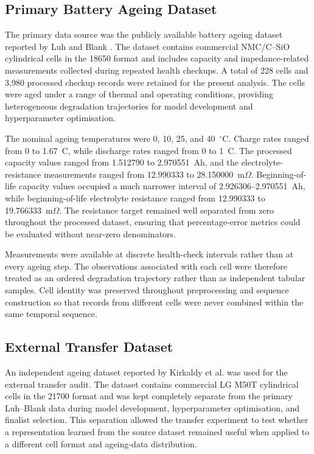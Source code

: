 \documentclass[a4paper,fleqn]{cas-sc}
\begin{document}
\subsection{Primary Battery Ageing Dataset}
\label{sec:primary_dataset}

The primary data source was the publicly available battery ageing dataset reported by Luh and Blank \cite{luh2024dataset}. The dataset contains commercial NMC/C--SiO cylindrical cells in the 18650 format and includes capacity and impedance-related measurements collected during repeated health checkups. A total of 228 cells and 3,980 processed checkup records were retained for the present analysis. The cells were aged under a range of thermal and operating conditions, providing heterogeneous degradation trajectories for model development and hyperparameter optimisation.

The nominal ageing temperatures were 0, 10, 25, and 40~$^{\circ}$C. Charge rates ranged from 0 to 1.67~C, while discharge rates ranged from 0 to 1~C. The processed capacity values ranged from 1.512790 to 2.970551~Ah, and the electrolyte-resistance measurements ranged from 12.990333 to 28.150000~m$\Omega$. Beginning-of-life capacity values occupied a much narrower interval of 2.926306--2.970551~Ah, while beginning-of-life electrolyte resistance ranged from 12.990333 to 19.766333~m$\Omega$. The resistance target remained well separated from zero throughout the processed dataset, ensuring that percentage-error metrics could be evaluated without near-zero denominators.

Measurements were available at discrete health-check intervals rather than at every ageing step. The observations associated with each cell were therefore treated as an ordered degradation trajectory rather than as independent tabular samples. Cell identity was preserved throughout preprocessing and sequence construction so that records from different cells were never combined within the same temporal sequence.




\subsection{External Transfer Dataset}
\label{sec:external_dataset}

An independent ageing dataset reported by Kirkaldy et al. \cite{kirkaldy2024dataset} was used for the external transfer audit. The dataset contains commercial LG M50T cylindrical cells in the 21700 format and was kept completely separate from the primary Luh--Blank data during model development, hyperparameter optimisation, and finalist selection. This separation allowed the transfer experiment to test whether a representation learned from the source dataset remained useful when applied to a different cell format and ageing-data distribution.
\end{document}
